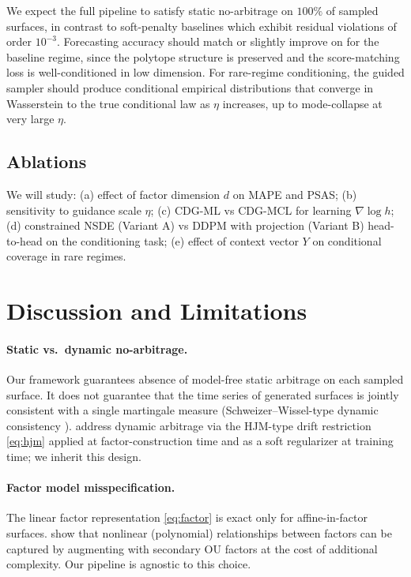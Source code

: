 \documentclass{article}
\newcommand{\1}{\mathbf{1}}
\begin{document}
We expect the full pipeline to satisfy static no-arbitrage on $100\%$ of sampled surfaces, in contrast to soft-penalty baselines \citep{jin2026} which exhibit residual violations of order $10^{-3}$. Forecasting accuracy should match or slightly improve on \citet{cohen2021} for the baseline regime, since the polytope structure is preserved and the score-matching loss is well-conditioned in low dimension. For rare-regime conditioning, the guided sampler should produce conditional empirical distributions that converge in Wasserstein to the true conditional law as $\eta$ increases, up to mode-collapse at very large $\eta$.

\subsection{Ablations}

We will study: (a) effect of factor dimension $d$ on MAPE and PSAS; (b) sensitivity to guidance scale $\eta$; (c) CDG-ML vs CDG-MCL for learning $\nabla \log h$; (d) constrained NSDE (Variant A) vs DDPM with projection (Variant B) head-to-head on the conditioning task; (e) effect of context vector $Y$ on conditional coverage in rare regimes.

\section{Discussion and Limitations}

\paragraph{Static vs.\ dynamic no-arbitrage.} Our framework guarantees absence of model-free static arbitrage on each sampled surface. It does not guarantee that the time series of generated surfaces is jointly consistent with a single martingale measure (Schweizer--Wissel-type dynamic consistency \citep{schweizer2008}). \citet{cohen2021} address dynamic arbitrage via the HJM-type drift restriction \eqref{eq:hjm} applied at factor-construction time and as a soft regularizer at training time; we inherit this design.

\paragraph{Factor model misspecification.} The linear factor representation \eqref{eq:factor} is exact only for affine-in-factor surfaces. \citet[Appendix G]{cohen2021} show that nonlinear (polynomial) relationships between factors can be captured by augmenting with secondary OU factors at the cost of additional complexity. Our pipeline is agnostic to this choice.
\end{document}

